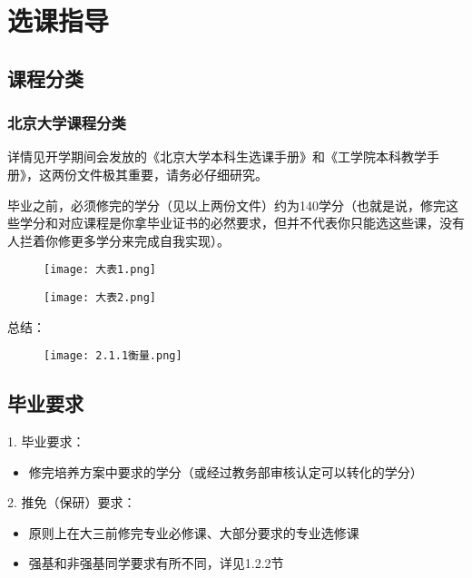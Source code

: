 \documentclass[11pt,oneside]{book}
\begin{document}
	
	
	
	
	
	
	
\chapter{选课指导}
\section{课程分类}
\subsection{北京大学课程分类}
详情见开学期间会发放的《北京大学本科生选课手册》和《工学院本科教学手册》，这两份文件极其重要，请务必仔细研究。

毕业之前，必须修完的学分（见以上两份文件）约为140学分（也就是说，修完这些学分和对应课程是你拿毕业证书的必然要求，但并不代表你只能选这些课，没有人拦着你修更多学分来完成自我实现）。

\begin{figure}[htbp]
	\centering
	\texttt{[image: 大表1.png]}
\end{figure}

\begin{figure}[htbp]
	\centering
	\texttt{[image: 大表2.png]}
\end{figure}



总结：
\begin{figure}[htbp]
	\centering
	\texttt{[image: 2.1.1衡量.png]}
\end{figure}

\section{毕业要求}
1. 毕业要求：

\begin{itemize}
	\item 修完培养方案中要求的学分（或经过教务部审核认定可以转化的学分）
\end{itemize}

2. 推免（保研）要求：

\begin{itemize}
	\item 原则上在大三前修完专业必修课、大部分要求的专业选修课
	\item 强基和非强基同学要求有所不同，详见1.2.2节
\end{itemize}
\end{document}
